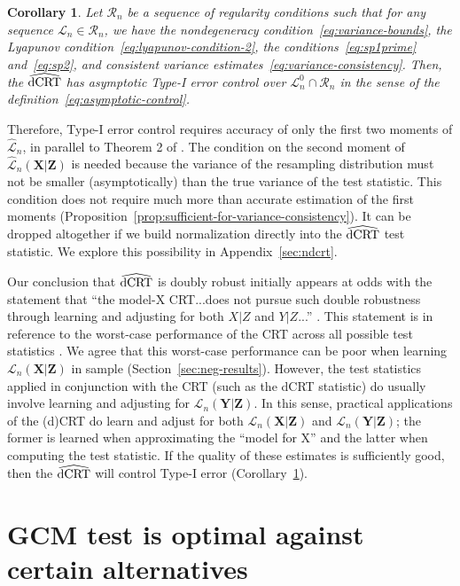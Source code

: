 \documentclass[aos]{imsart}
\theoremstyle{plain}
\newtheorem{corollary}{Corollary}
\theoremstyle{remark}
\newcommand{\prx}{\bm X}								%
\newcommand{\prz}{\bm Z}								%
\newcommand{\pry}{{\bm Y}}								%
\newcommand{\law}{\mathcal L}							%
\newcommand{\nulllaws}{\mathscr L^0}					%
\newcommand{\regclass}{\mathscr R}					    %
\newcommand{\lawhat}{\widehat{\mathcal L}}				%
\newcommand{\dCRThat}{\widehat{\textnormal{dCRT}}}		%
\begin{document}
\begin{corollary} \label{cor:dcrt-double-robustness}
    Let $\regclass_n$ be a sequence of regularity conditions such that for any sequence $\law_n \in \regclass_n$, we have the nondegeneracy condition~\eqref{eq:variance-bounds}, the Lyapunov condition~\eqref{eq:lyapunov-condition-2}, the conditions~\eqref{eq:sp1prime} and~\eqref{eq:sp2}, and consistent variance estimates~\eqref{eq:variance-consistency}. Then, the $\dCRThat$ has asymptotic Type-I error control over $\nulllaws_n \cap \regclass_n$ in the sense of the definition~\eqref{eq:asymptotic-control}.
\end{corollary}

Therefore, Type-I error control requires accuracy of only the first two moments of $\lawhat_n$, in parallel to Theorem 2 of \citet{Katsevich2020a}. The condition on the second moment of $\lawhat_n(\prx|\prz)$ is needed because the variance of the resampling distribution must not be smaller (asymptotically) than the true variance of the test statistic. This condition does not require much more than accurate estimation of the first moments (Proposition~\ref{prop:sufficient-for-variance-consistency}). It can be dropped altogether if we build normalization directly into the $\dCRThat$ test statistic. We explore this possibility in Appendix~\ref{sec:ndcrt}.

Our conclusion that $\dCRThat$ is doubly robust initially appears at odds with the statement that ``the model-X CRT...does not pursue such double robustness through learning and adjusting for both $X|Z$ and $Y|Z$...'' \citep{Li2022}. This statement is in reference to the worst-case performance of the CRT across all possible test statistics \citep{Berrett2019}. We agree that this worst-case performance can be poor when learning $\law_n(\prx|\prz)$ in sample (Section~\ref{sec:neg-results}). However, the test statistics applied in conjunction with the CRT (such as the dCRT statistic) do usually involve learning and adjusting for $\law_n(\pry|\prz)$. In this sense, practical applications of the (d)CRT do learn and adjust for both $\law_n(\prx|\prz)$ and $\law_n(\pry|\prz)$; the former is learned when approximating the ``model for X'' and the latter when computing the test statistic. If the quality of these estimates is sufficiently good, then the $\dCRThat$ will control Type-I error (Corollary~\ref{cor:dcrt-double-robustness}).


\section{GCM test is optimal against certain alternatives} \label{sec:optimality}
\end{document}
